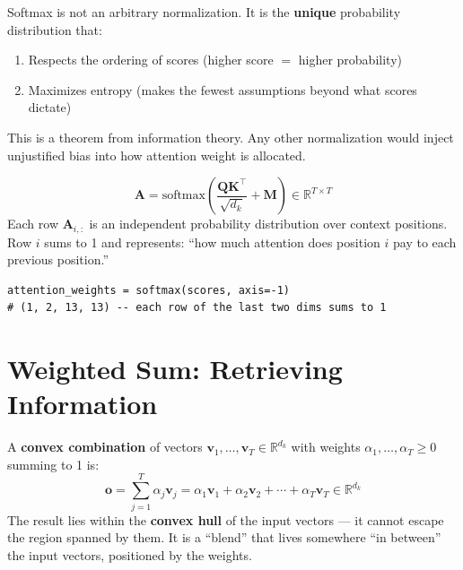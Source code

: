\documentclass[11pt, a4paper]{article}
\newcommand{\R}{\mathbb{R}}
\newcommand{\vv}{\bm{v}}
\newcommand{\vo}{\bm{o}}
\newcommand{\mQ}{\bm{Q}}
\newcommand{\mK}{\bm{K}}
\newcommand{\mA}{\bm{A}}
\begin{document}
\begin{intuition}
Softmax is not an arbitrary normalization. It is the \textbf{unique} probability distribution
that:
\begin{enumerate}[nosep]
  \item Respects the ordering of scores (higher score $=$ higher probability)
  \item Maximizes entropy (makes the fewest assumptions beyond what scores dictate)
\end{enumerate}
This is a theorem from information theory. Any other normalization would inject
unjustified bias into how attention weight is allocated.
\end{intuition}

\begin{transformer}
\[
\mA = \text{softmax}\!\left(\frac{\mQ\mK^\top}{\sqrt{d_k}} + \bm{M}\right) \in \R^{T \times T}
\]
Each row $\mA_{i,:}$ is an independent probability distribution over context positions.
Row $i$ sums to 1 and represents: ``how much attention does position $i$ pay to each
previous position.''

\begin{verbatim}
attention_weights = softmax(scores, axis=-1)
# (1, 2, 13, 13) -- each row of the last two dims sums to 1
\end{verbatim}
\end{transformer}

\section{Weighted Sum: Retrieving Information}

\begin{formaldef}
A \textbf{convex combination} of vectors $\vv_1, \ldots, \vv_T \in \R^{d_k}$
with weights $\alpha_1, \ldots, \alpha_T \geq 0$ summing to 1 is:
\[
\vo = \sum_{j=1}^{T} \alpha_j \vv_j = \alpha_1 \vv_1 + \alpha_2 \vv_2 + \cdots + \alpha_T \vv_T \in \R^{d_k}
\]
The result lies within the \textbf{convex hull} of the input vectors --- it cannot
escape the region spanned by them. It is a ``blend'' that lives somewhere
``in between'' the input vectors, positioned by the weights.
\end{formaldef}
\end{document}
